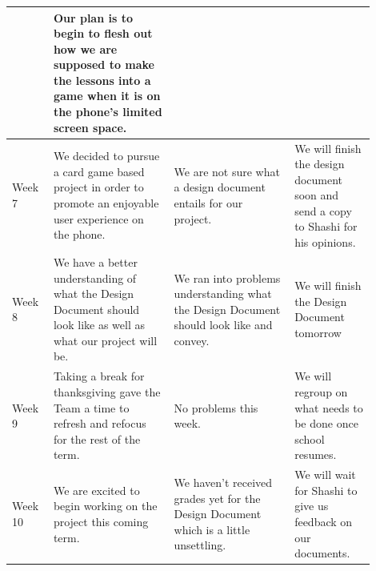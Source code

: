 \documentclass[draftclsnofoot,10pt,onecolumn]{IEEEtran}
\begin{document}
\begin{tabular}{p{0.1\linewidth}p{0.3\linewidth}p{0.3\linewidth}p{0.2\linewidth}}
             & Our plan is to begin to flesh out how we are supposed to make the lessons into a game when it is on the phone's limited screen space.\\
            \hline
             Week 7
             & We decided to pursue a card game based project in order to promote an enjoyable user experience on the phone.
             & We are not sure what a design document entails for our project.
             & We will finish the design document soon and send a copy to Shashi for his opinions.\\
            \hline
             Week 8
             & We have a better understanding of what the Design Document should look like as well as what our project will be.
             & We ran into problems understanding what the Design Document should look like and convey.
             & We will finish the Design Document tomorrow\\
            \hline
             Week 9
             & Taking a break for thanksgiving gave the Team a time to refresh and refocus for the rest of the term.
             & No problems this week.
             & We will regroup on what needs to be done once school resumes.\\
            \hline
             Week 10
             & We are excited to begin working on the project this coming term.
             & We haven't received grades yet for the Design Document which is a little unsettling.
             & We will wait for Shashi to give us feedback on our documents.\\
            \hline
             
        \end{tabular}
        \newpage
\end{document}

